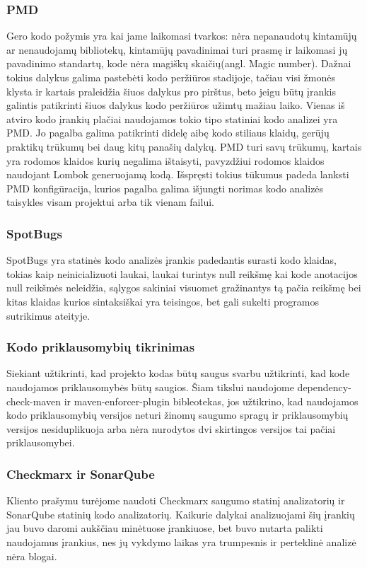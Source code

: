\documentclass{VUMIFPSkursinis}
\begin{document}
		\subsubsection{PMD}
			Gero kodo požymis yra kai jame laikomasi tvarkos: nėra nepanaudotų kintamūjų ar nenaudojamų bibliotekų, kintamūjų pavadinimai turi prasmę ir laikomasi jų pavadinimo standartų, kode nėra magiškų skaičių(angl. Magic number). Dažnai tokius dalykus galima pastebėti kodo peržiūros stadijoje, tačiau visi žmonės klysta ir kartais praleidžia šiuos dalykus pro pirštus, beto jeigu būtų įrankis galintis patikrinti šiuos dalykus kodo peržiūros užimtų mažiau laiko.
			Vienas iš atviro kodo įrankių plačiai naudojamos tokio tipo statiniai kodo analizei yra PMD. Jo pagalba galima patikrinti didelę aibę kodo stiliaus klaidų, gerūjų praktikų trūkumų bei daug kitų panašių dalykų.
			PMD turi savų trūkumų, kartais yra rodomos klaidos kurių negalima ištaisyti, pavyzdžiui rodomos klaidos naudojant Lombok generuojamą kodą.
			Išspręsti tokius tūkumus padeda lanksti PMD konfigūracija, kurios pagalba galima išjungti norimas kodo analizės taisykles visam projektui arba tik vienam failui.
		\subsubsection{SpotBugs}
			SpotBugs yra statinės kodo analizės įrankis padedantis surasti kodo klaidas, tokias kaip neinicializuoti laukai, laukai turintys null reikšmę kai kode anotacijos null reikšmės neleidžia, sąlygos sakiniai visuomet gražinantys tą pačia reikšmę bei kitas klaidas kurios sintaksiškai yra teisingos, bet gali sukelti programos sutrikimus ateityje.
		\subsubsection{Kodo priklausomybių tikrinimas}
			Siekiant užtikrinti, kad projekto kodas būtų saugus svarbu užtikrinti, kad kode naudojamos priklausomybės būtų saugios.
			Šiam tikslui naudojome dependency-check-maven ir maven-enforcer-plugin bibleotekas, jos užtikrino, kad naudojamos kodo priklausomybių versijos neturi žinomų saugumo spragų ir priklausomybių versijos nesiduplikuoja arba nėra nurodytos dvi skirtingos versijos tai pačiai priklausomybei.
		\subsubsection{Checkmarx ir SonarQube}
			Kliento prašymu turėjome naudoti Checkmarx saugumo statinį analizatorių ir SonarQube statinių kodo analizatorių.
			Kaikurie dalykai analizuojami šių įrankių jau buvo daromi aukščiau minėtuose įrankiuose, bet buvo nutarta palikti naudojamus įrankius, nes jų vykdymo laikas yra trumpesnis ir perteklinė analizė nėra blogai.
\end{document}
